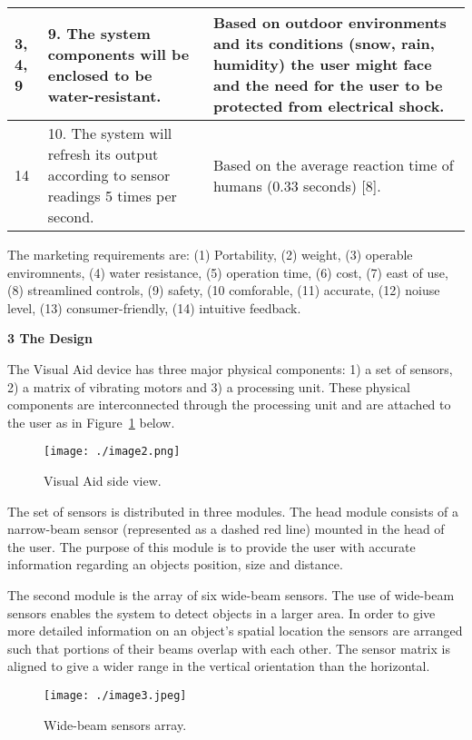 \begin{table}[h]
\begin{tabular}{|p{2cm}|p{5cm}|p{6cm}|}
3, 4, 9 & 
		9. The system components will be enclosed to be water-resistant.	&
		Based on outdoor environments and its conditions (snow,
		rain, humidity) the user might face and the need for the user to be 
		protected from electrical shock. \\ \hline

14 & 
		10. The system will refresh its output according to sensor readings 5
		  times per second. &
		Based on the average reaction time of humans (0.33 seconds) {[}8{]}. \\ \hline

\end{tabular}
\end{table}

The marketing requirements are: (1) Portability, (2) weight, (3) operable enviromnents, 
(4) water resistance, (5) operation time, (6) cost, (7) east of use, 
(8) streamlined controls, (9) safety, (10 comforable, (11) accurate, (12) noiuse level, 
(13) consumer-friendly, (14) intuitive feedback.


\textbf{3 The Design}

The Visual Aid device has three major physical components: 1) a set of
sensors, 2) a matrix of vibrating motors and 3) a processing unit. These
physical components are interconnected through the processing unit and
are attached to the user as in Figure~\ref{figure:caseStudySideView} below.


\begin{figure}[h]
\centering
\texttt{[image: ./image2.png]}
\caption{Visual Aid side view.}
\label{figure:caseStudySideView}
\end{figure}

The set of sensors is distributed in three modules. The head module
consists of a narrow-beam sensor (represented as a dashed red line)
mounted in the head of the user. The purpose of this module is to
provide the user with accurate information regarding an objects
position, size and distance.

The second module is the array of six wide-beam sensors. The use of
wide-beam sensors enables the system to detect objects in a larger area.
In order to give more detailed information on an object's spatial
location the sensors are arranged such that portions of their beams
overlap with each other. The sensor matrix is aligned to give a wider
range in the vertical orientation than the horizontal.

\begin{figure}[h]
\centering
\texttt{[image: ./image3.jpeg]}
\caption{Wide-beam sensors array.}
\label{figure:caseStudyWideBeam}
\end{figure}

